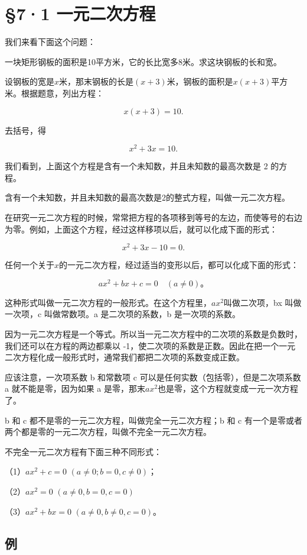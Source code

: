 \section{§7·1 一元二次方程}

我们来看下面这个问题：

一块矩形钢板的面积是10平方米，它的长比宽多8米。求这块钢板的长和宽。

设钢板的宽是\(x\)米，那末钢板的长是\((x + 3)\)米，钢板的面积是\(x(x + 3)\)平方米。根据题意，列出方程：

\[
x (x + 3) = 10.
\]

去括号，得

\[
x ^ {2} + 3 x = 10.
\]

我们看到，上面这个方程是含有一个未知数，并且未知数的最高次数是 2
的方程。

含有一个未知数，并且未知数的最高次数是2的整式方程，叫做一元二次方程。

在研究一元二次方程的时候，常常把方程的各项移到等号的左边，而使等号的右边为零。例如，上面这个方程，经过这样移项以后，就可以化成下面的形式：

\[
x ^ {2} + 3 x - 10 = 0.
\]

任何一个关于\(x\)的一元二次方程，经过适当的变形以后，都可以化成下面的形式：

\[
a x ^ {2} + b x + c = 0 \quad (a \neq 0)\text{。}
\]

这种形式叫做一元二次方程的一般形式。在这个方程里，\(ax^{2}\)叫做二次项，bx
叫做一次项，c 叫做常数项。a 是二次项的系数，b 是一次项的系数。

因为一元二次方程是一个等式。所以当一元二次方程中的二次项的系数是负数时，我们还可以在方程的两边都乘以
-1，使二次项的系数是正数。因此在把一个一元二次方程化成一般形式时，通常我们都把二次项的系数变成正数。

应该注意，一次项系数 b 和常数项 c
可以是任何实数（包括零），但是二次项系数 a 就不能是零，因为如果 a
是零，那末\(ax^{2}\)也是零，这个方程就变成一元一次方程了。

b 和 c 都不是零的一元二次方程，叫做完全一元二次方程；b 和 c
有一个是零或者两个都是零的一元二次方程，叫做不完全一元二次方程。

不完全一元二次方程有下面三种不同形式：

（1）\(ax^2 + c = 0\) \((a \neq 0; b = 0, c \neq 0)\)；

（2）\(ax^2 = 0\) \((a\neq 0,b = 0,c = 0)\)

（3）\(ax^2 + bx = 0\) \((a \neq 0, b \neq 0, c = 0)\)。

\subsection{例}

